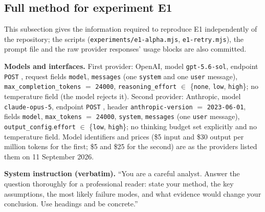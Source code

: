 \documentclass[11pt]{article}
\begin{document}
\subsection{Full method for experiment E1}
\label{app:e1-method}

This subsection gives the information required to reproduce E1 independently of the repository; the scripts
(\texttt{experiments/e1-alpha.mjs}, \texttt{e1-retry.mjs}), the prompt file and the raw
provider responses' usage blocks are also committed.

{\sloppy \textbf{Models and interfaces.} First provider: OpenAI, model \texttt{gpt-5.6-sol}, endpoint
\texttt{POST} , request fields \texttt{model},
\texttt{messages} (one \texttt{system} and one \texttt{user} message),
\texttt{max\_completion\_tokens} $=$ \texttt{24000}, \texttt{reasoning\_effort} $\in$
\{\texttt{none}, \texttt{low}, \texttt{high}\}; no temperature field (the model rejects it).
Second provider: Anthropic, model \texttt{claude-opus-5}, endpoint
\texttt{POST} , header \texttt{anthropic-version} $=$ \texttt{2023-06-01}, fields \texttt{model}, \texttt{max\_tokens} $=$ \texttt{24000}, \texttt{system},
\texttt{messages} (one \texttt{user} message), \texttt{output\_config}.\texttt{effort} $\in$
\{\texttt{low}, \texttt{high}\}; no thinking budget set explicitly and no temperature field.
Model identifiers and prices (\$5 input and \$30 output per million tokens for the first;
\$5 and \$25 for the second) are as the providers listed them on 11 September 2026.\par}

\textbf{System instruction (verbatim).} ``You are a careful analyst. Answer the question thoroughly for a professional reader: state your method, the key assumptions, the most likely failure modes, and what evidence would change your conclusion. Use headings and be concrete.''
\end{document}
